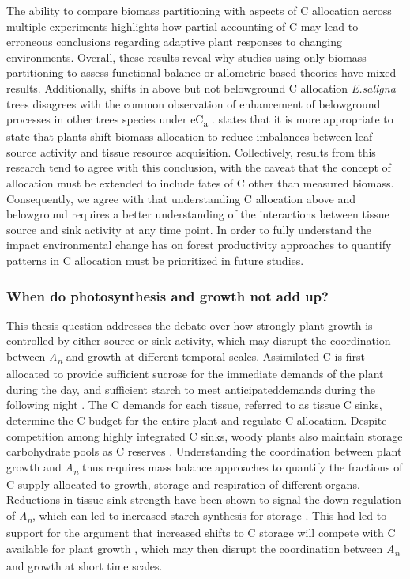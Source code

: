 \documentclass[a4paper]{article}\usepackage[]{graphicx}\usepackage[]{color}
\begin{document}
The ability to compare biomass partitioning with aspects of C allocation across multiple experiments highlights how partial accounting of C may lead to erroneous conclusions regarding adaptive plant responses to changing environments. Overall, these results reveal why studies using only biomass partitioning to assess functional balance or allometric based theories have mixed results. Additionally, shifts in above but not belowground C allocation \textit{E.saligna} trees disagrees with the common observation of enhancement of belowground processes in other trees species under eC\textsubscript{a} \citep[see]{palmroth2006aboveground, iversen2014terrestrial}. \citet{shipley2002balanced} states that it is more appropriate to state that plants shift biomass allocation to reduce imbalances between leaf source activity and tissue resource acquisition. Collectively, results from this research tend to agree with this conclusion, with the caveat that the concept of allocation must be extended to include fates of C other than measured biomass. Consequently, we agree with \citet{poorter2012biomass} that understanding C allocation above and belowground requires a better understanding of the interactions between tissue source and sink activity at any time point. In order to fully understand the impact environmental change has on forest productivity approaches to quantify patterns in C allocation must be prioritized in future studies.

\subsubsection*{When do photosynthesis and growth not add up?}

This thesis question addresses the debate over how strongly plant growth is controlled by either source or sink activity, which may disrupt the coordination between \textit{A\textsubscript{n}} and growth at different temporal scales. Assimilated C is first allocated to provide sufficient sucrose for the immediate demands of the plant during the day, and sufficient starch to meet \textquotesingle anticipated\textquotesingle demands during the following night \citep{smith2007coordination}. The C demands for each tissue, referred to as tissue C sinks, determine the C budget for the entire plant and regulate C allocation. Despite competition among highly integrated C sinks, woody plants also maintain storage carbohydrate pools as C reserves \citep{kozlowski1992carbohydrate}. Understanding the coordination between plant growth and \textit{A\textsubscript{n}} thus requires mass balance approaches to quantify the fractions of C supply allocated to growth, storage and respiration of different organs. Reductions in tissue sink strength have been shown to signal the down regulation of \textit{A\textsubscript{n}}, which can led to increased starch synthesis for storage \citep{sage1994acclimation, kitao2007interaction}. This had led to support for the argument that increased shifts to C storage will compete with C available for plant growth \citep{chapin1990ecology}, which may then disrupt the coordination between \textit{A\textsubscript{n}} and growth at short time scales.
\end{document}
